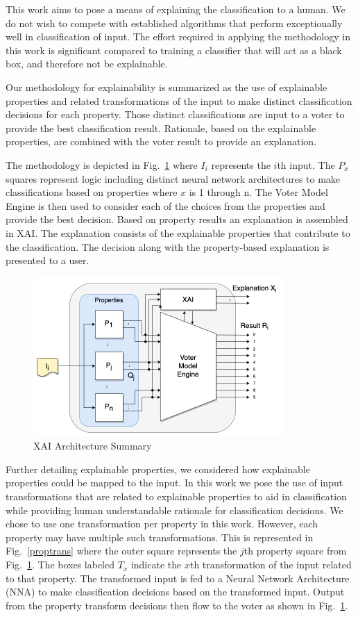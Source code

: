 \documentclass[conference]{IEEEtran}
\begin{document}
This work aims to pose a means of explaining the classification to a human.  We do not wish to compete with established algorithms that perform exceptionally well in classification of input.   The effort required in applying the methodology in this work is significant compared to training a classifier that will act as a black box, and therefore not be explainable.

Our methodology for explainability is summarized as the use of explainable properties and related transformations of the input to make distinct classification decisions for each property.  Those distinct classifications are input to a voter to provide the best classification result.  Rationale, based on the explainable properties, are combined with the voter result to provide an explanation. 

The methodology is depicted in Fig.~\ref{voting} where $I_i$ represents the $i$th input.  The $P_x$ squares represent logic including distinct neural network architectures to make classifications based on properties where $x$ is 1 through n.  The Voter Model Engine is then used to consider each of the choices from the properties and provide the best decision.  Based on property results an explanation is assembled in XAI.   The explanation consists of the explainable properties that contribute to the classification.   The decision along with the property-based explanation is presented to a user.

 \begin{figure}[htbp]
\centerline{\includegraphics[width=95mm]{./images/voting_prop_nn_2.png}}
\caption{XAI Architecture Summary}
\label{voting}
\end{figure}

Further detailing explainable properties, we considered how explainable properties could be mapped to the input.  In this work we pose the use of input transformations that are related to explainable properties to aid in classification while providing human understandable rationale for classification decisions.  We chose to use one transformation per property in this work.  However, each property may have multiple such transformations.  This is represented in Fig.~\ref{proptrans} where the outer square represents the $j$th property square from Fig.~\ref{voting}.  The boxes labeled $T_x$ indicate the $x$th transformation of the input related to that property.  The transformed input is fed to a Neural Network Architecture (NNA) to make classification decisions based on the transformed input.  Output from the property transform decisions then flow to the voter as shown in Fig.~\ref{voting}.
\end{document}
